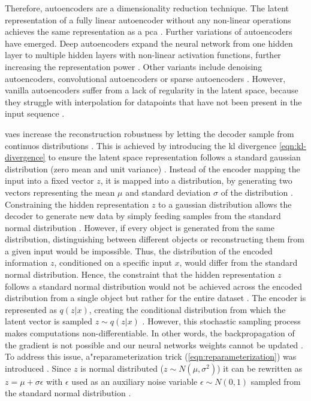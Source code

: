 Therefore, autoencoders are a dimensionality reduction technique.
The latent representation of a fully linear autoencoder without any non-linear operations achieves the same representation as a \gls{pca} \cite{plaut2018PrincipalSubspacesPrincipal,Bank2020Autoencoders}.
Further variations of autoencoders have emerged.
Deep autoencoders expand the neural network from one hidden layer to multiple hidden layers with non-linear activation functions, further increasing the representation power \cite{aggarwal2018NeuralNetworksDeep}.
Other variants include denoising autoencoders, convolutional autoencoders or sparse autoencoders \cite{maheshwari2022AutoencoderIssuesChallenges,Goodfellow-et-al-2016}.
However, vanilla autoencoders suffer from a lack of regularity in the latent space, because they struggle with interpolation for datapoints that have not been present in the input sequence \cite{razghandi2022VariationalAutoencoderGenerativea}.

\glspl{vae} increase the reconstruction robustness by letting the decoder sample from continuos distributions \cite{kingma2013AutoEncodingVariationalBayes}.
This is achieved by introducing the \gls{kl} divergence \autoref{eqn:kl-divergence} to ensure the latent space representation follows a standard gaussian distribution (zero mean and unit variance) \cite{razghandi2022VariationalAutoencoderGenerativea, aggarwal2018NeuralNetworksDeep}.
Instead of the encoder mapping the input into a fixed vector $z$, it is mapped into a distribution, by generating two vectors representing the mean $\mu$ and standard deviation $\sigma$ of the distribution \cite{razghandi2022VariationalAutoencoderGenerativea, aggarwal2018NeuralNetworksDeep}.
Constraining the hidden representation $z$ to a gaussian distribution allows the decoder to generate new data by simply feeding samples from the standard normal distribution \cite{aggarwal2018NeuralNetworksDeep}.
However, if every object is generated from the same distribution, distinguishing between different objects or reconstructing them from a given input would be impossible.
Thus, the distribution of the encoded information $z$, conditioned on a specific input $x$, would differ from the standard normal distribution.
Hence, the constraint that the hidden representation $z$ follows a standard normal distribution would not be achieved across the encoded distribution from a single object but rather for the entire dataset \cite{aggarwal2018NeuralNetworksDeep}.
The encoder is represented as $q(z|x)$, creating the conditional distribution from which the latent vector is sampled $z\sim q(z|x)$ \cite{kingma2013AutoEncodingVariationalBayes}.
However, this stochastic sampling process makes computations non-differentiable.
In other words, the backpropagation of the gradient is not possible and our neural networks weights cannot be updated \cite{aggarwal2018NeuralNetworksDeep}.
To address this issue, a"reparameterization trick (\autoref{eqn:reparameterization}) was introduced \cite[p. 4]{kingma2013AutoEncodingVariationalBayes}.
Since $z$ is normal distributed ($z\sim N(\mu,\sigma^2)$) it can be rewritten as $z=\mu+\sigma\epsilon$ with $\epsilon$ used as an auxiliary noise variable $\epsilon \sim N(0,1)$ sampled from the standard normal distribution \cite{kingma2013AutoEncodingVariationalBayes}.

